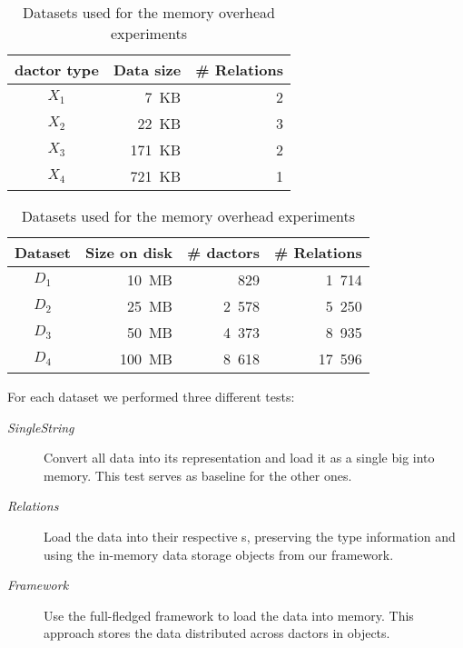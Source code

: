   \begin{table}
    \centering
    \begin{subtable}[t]{0.445\textwidth}
      \centering
      \begin{tabular}{@{}crr@{}}
        \toprule
        \textbf{\gls{dactor} type} & \textbf{Data size} & \textbf{\# Relations}\\
        \midrule
        $X_1$ &   7~KB & 2 \\ %
        $X_2$ &  22~KB & 3 \\ %
        $X_3$ & 171~KB & 2 \\ %
        $X_4$ & 721~KB & 1 \\ %
        \bottomrule
      \end{tabular}
      \label{tab:datasets:size_distribution}
    \end{subtable}
    \begin{subtable}[t]{0.545\textwidth}
      \centering
      \begin{tabular}{@{}crrr@{}}
        \toprule
        \textbf{Dataset} & \textbf{Size on disk} & \textbf{\# \glspl{dactor}} & \textbf{\# Relations}\\
        \midrule
        $D_1$ & 10~MB & 829 & 1~714 \\
        $D_2$ & 25~MB & 2~578 & 5~250 \\
        $D_3$ & 50~MB & 4~373 & 8~935 \\
        $D_4$ & 100~MB & 8~618 & 17~596 \\
        \bottomrule
      \end{tabular}
      \label{tab:datasets:keyfigures}
    \end{subtable}
    \caption{Datasets used for the memory overhead experiments}
    \label{tab_datasets}
  \end{table}

  For each dataset we performed three different tests:
  \begin{description}
    \item[\textit{SingleString}] Convert all data into its  representation and load it as a single big  into memory.
      This test serves as baseline for the other ones.
    \item[\textit{Relations}] Load the data into their respective s, preserving the type information and using the in-memory data storage objects from our framework.
    \item[\textit{Framework}] Use the full-fledged framework to load the data into memory.
      This approach stores the data distributed across \glspl{dactor} in  objects.
  \end{description}

